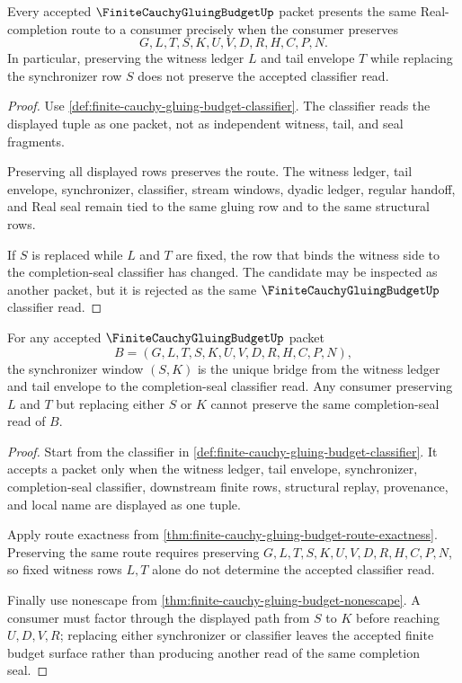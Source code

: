\begin{theorem}
\label{thm:finite-cauchy-gluing-budget-route-exactness}
Every accepted $\FiniteCauchyGluingBudgetUp$ packet presents the same Real-completion route to a consumer precisely when the consumer preserves
$$
G,L,T,S,K,U,V,D,R,H,C,P,N.
$$
In particular, preserving the witness ledger $L$ and tail envelope $T$ while replacing the synchronizer row $S$ does not preserve the accepted classifier read.
\end{theorem}
\begin{proof}
Use \autoref{def:finite-cauchy-gluing-budget-classifier}. The classifier reads the displayed tuple as one packet, not as independent witness, tail, and seal fragments.

Preserving all displayed rows preserves the route. The witness ledger, tail envelope, synchronizer, classifier, stream windows, dyadic ledger, regular handoff, and Real seal remain tied to the same gluing row and to the same structural rows.

If $S$ is replaced while $L$ and $T$ are fixed, the row that binds the witness side to the completion-seal classifier has changed. The candidate may be inspected as another packet, but it is rejected as the same $\FiniteCauchyGluingBudgetUp$ classifier read.
\end{proof}

\begin{theorem}
\label{thm:finite-cauchy-gluing-budget-synchronizer-window-exactness}
For any accepted $\FiniteCauchyGluingBudgetUp$ packet
$$
B=(G,L,T,S,K,U,V,D,R,H,C,P,N),
$$
the synchronizer window $(S,K)$ is the unique bridge from the witness ledger and tail envelope to the completion-seal classifier read. Any consumer preserving $L$ and $T$ but replacing either $S$ or $K$ cannot preserve the same completion-seal read of $B$.
\end{theorem}
\begin{proof}
Start from the classifier in \autoref{def:finite-cauchy-gluing-budget-classifier}. It accepts a packet only when the witness ledger, tail envelope, synchronizer, completion-seal classifier, downstream finite rows, structural replay, provenance, and local name are displayed as one tuple.

Apply route exactness from \autoref{thm:finite-cauchy-gluing-budget-route-exactness}. Preserving the same route requires preserving $G,L,T,S,K,U,V,D,R,H,C,P,N$, so fixed witness rows $L,T$ alone do not determine the accepted classifier read.

Finally use nonescape from \autoref{thm:finite-cauchy-gluing-budget-nonescape}. A consumer must factor through the displayed path from $S$ to $K$ before reaching $U,D,V,R$; replacing either synchronizer or classifier leaves the accepted finite budget surface rather than producing another read of the same completion seal.
\end{proof}

